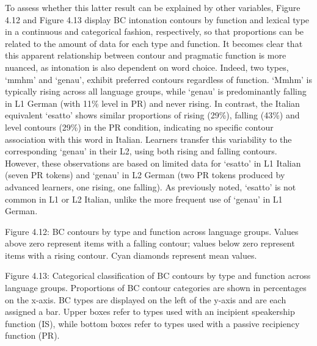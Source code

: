 \begin{styleStandard}
To assess whether this latter result can be explained by other variables, Figure 4.12 and Figure 4.13 display BC intonation contours by function and lexical type in a continuous and categorical fashion, respectively, so that proportions can be related to the amount of data for each type and function. It becomes clear that this apparent relationship between contour and pragmatic function is more nuanced, as intonation is also dependent on word choice. Indeed, two types, ‘mmhm’ and ‘genau’, exhibit preferred contours regardless of function. ‘Mmhm’ is typically rising across all language groups, while ‘genau’ is predominantly falling in L1 German (with 11\% level in PR) and never rising. In contrast, the Italian equivalent ‘esatto’ shows similar proportions of rising (29\%), falling (43\%) and level contours (29\%) in the PR condition, indicating no specific contour association with this word in Italian. Learners transfer this variability to the corresponding ‘genau’ in their L2, using both rising and falling contours. However, these observations are based on limited data for ‘esatto’ in L1 Italian (seven PR tokens) and ‘genau’ in L2 German (two PR tokens produced by advanced learners, one rising, one falling). As previously noted, ‘esatto’ is not common in L1 or L2 Italian, unlike the more frequent use of ‘genau’ in L1 German.
\end{styleStandard}

\begin{styleStandard}
  [Warning: Image ignored] %
 
\end{styleStandard}

\begin{stylecaption}
Figure 4.12: BC contours by type and function across language groups. Values above zero represent items with a falling contour; values below zero represent items with a rising contour. Cyan diamonds represent mean values.
\end{stylecaption}

\begin{stylecaption}
  [Warning: Image ignored] %
 Figure 4.13: Categorical classification of BC contours by type and function across language groups. Proportions of BC contour categories are shown in percentages on the x-axis. BC types are displayed on the left of the y-axis and are each assigned a bar. Upper boxes refer to types used with an incipient speakership function (IS), while bottom boxes refer to types used with a passive recipiency function (PR).
\end{stylecaption}

